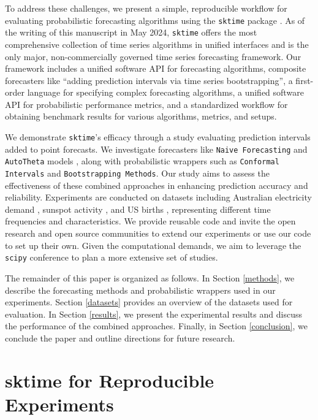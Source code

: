 To address these challenges, we present a simple, reproducible workflow for evaluating probabilistic forecasting algorithms using the \texttt{sktime} package \cite{franz_kiraly_2024_11095261_sktime}. As of the writing of this manuscript in May 2024, \texttt{sktime} offers the most comprehensive collection of time series algorithms in unified interfaces and is the only major, non-commercially governed time series forecasting framework. Our framework includes a unified software API for forecasting algorithms, composite forecasters like ``adding prediction intervals via time series bootstrapping'', a first-order language for specifying complex forecasting algorithms, a unified software API for probabilistic performance metrics, and a standardized workflow for obtaining benchmark results for various algorithms, metrics, and setups.

We demonstrate \texttt{sktime}'s efficacy through a study evaluating prediction intervals added to point forecasts. We investigate forecasters like \texttt{Naive Forecasting} and \texttt{AutoTheta} models \cite{autotheta}, along with probabilistic wrappers such as \texttt{Conformal Intervals} and \texttt{Bootstrapping Methods}. Our study aims to assess the effectiveness of these combined approaches in enhancing prediction accuracy and reliability. Experiments are conducted on datasets including Australian electricity demand \cite{Godahewa2021Australian}, sunspot activity \cite{Godahewa2021Sunspot}, and US births \cite{Godahewa2021USBirth}, representing different time frequencies and characteristics. We provide reusable code and invite the open research and open source communities to extend our experiments or use our code to set up their own. Given the computational demands, we aim to leverage the \texttt{scipy} conference to plan a more extensive set of studies.

The remainder of this paper is organized as follows. In Section \ref{methods}, we describe the forecasting methods and probabilistic wrappers used in our experiments. Section \ref{datasets} provides an overview of the datasets used for evaluation. In Section \ref{results}, we present the experimental results and discuss the performance of the combined approaches. Finally, in Section \ref{conclusion}, we conclude the paper and outline directions for future research.

\section{sktime for Reproducible Experiments}\label{sktime}

